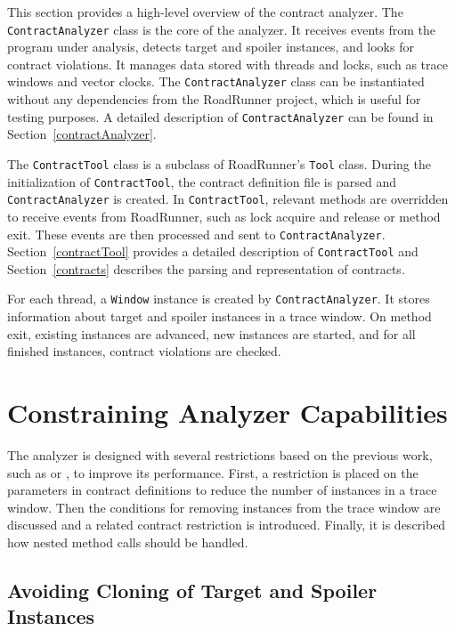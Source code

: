 This section provides a high-level overview of the contract analyzer. The
\texttt{ContractAnalyzer} class is the core of the analyzer. It receives events
from the program under analysis, detects target and spoiler instances, and looks
for contract violations. It manages data stored with threads and locks, such as
trace windows and vector clocks. The \texttt{ContractAnalyzer} class can be
instantiated without any dependencies from the RoadRunner project, which is
useful for testing purposes. A detailed description of \texttt{ContractAnalyzer}
can be found in Section~\ref{contractAnalyzer}.

The \texttt{ContractTool} class is a subclass of RoadRunner's \texttt{Tool}
class. During the initialization of \texttt{ContractTool}, the contract
definition file is parsed and \texttt{ContractAnalyzer} is created. In
\texttt{ContractTool}, relevant methods are overridden to receive events from
RoadRunner, such as lock acquire and release or method exit. These events are
then processed and sent to \texttt{ContractAnalyzer}. Section~\ref{contractTool}
provides a detailed description of \texttt{ContractTool} and
Section~\ref{contracts} describes the parsing and representation of contracts.

For each thread, a \texttt{Window} instance is created by
\texttt{ContractAnalyzer}. It stores information about target and spoiler
instances in a trace window. On method exit, existing instances are advanced,
new instances are started, and for all finished instances, contract violations
are checked.

\section{Constraining Analyzer Capabilities}
\label{constraining}

The analyzer is designed with several restrictions based on the previous work,
such as \cite{janousek} or \cite{FITPUB10817}, to improve its performance.
First, a restriction is placed on the parameters in contract definitions to
reduce the number of instances in a trace window. Then the conditions for
removing instances from the trace window are discussed and a related contract
restriction is introduced. Finally, it is described how nested method calls
should be handled.

\subsection{Avoiding Cloning of Target and Spoiler Instances}

